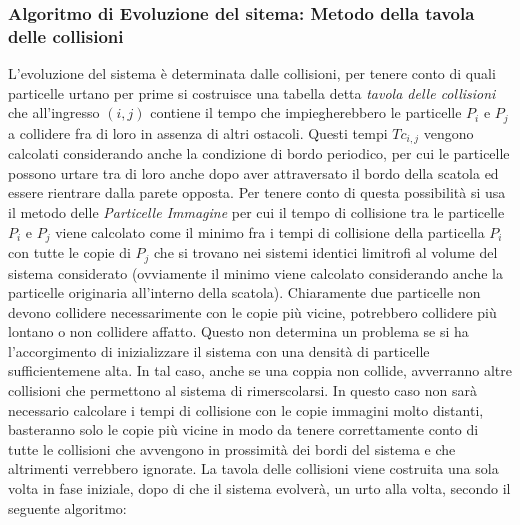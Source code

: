 \documentclass[11pt]{article}
\theoremstyle{plain}
\theoremstyle{remark}
\begin{document}
\subsubsection{Algoritmo di Evoluzione del sitema: Metodo della tavola delle collisioni}
L'evoluzione del sistema è determinata dalle collisioni, per tenere conto di quali particelle urtano per prime si costruisce una tabella detta \emph{tavola delle collisioni} che all'ingresso $(i,j)$ contiene il tempo che impiegherebbero le particelle $P_i$ e $P_j$ a collidere fra di loro in assenza di altri ostacoli.
Questi tempi $Tc_{i,j}$ vengono calcolati considerando anche la condizione di bordo periodico, per cui le particelle possono urtare tra di loro anche dopo aver attraversato il bordo della scatola ed essere rientrare dalla parete opposta.
\medskip\newline
Per tenere conto di questa possibilità si usa il metodo delle \emph{Particelle Immagine} per cui il tempo di collisione tra le particelle $P_i$ e $P_j$ viene calcolato come il minimo fra i tempi di collisione della particella $P_i$ con tutte le copie di $P_j$ che si trovano nei sistemi identici limitrofi al volume del sistema considerato (ovviamente il minimo viene calcolato considerando anche la particelle originaria all'interno della scatola).
\medskip\newline
Chiaramente due particelle non devono collidere necessarimente con le copie più vicine, potrebbero collidere più lontano o non collidere affatto. Questo non determina un problema se si ha l'accorgimento di inizializzare il sistema con una densità di particelle sufficientemene alta. In tal caso, anche se una coppia non collide, avverranno altre collisioni che permettono al sistema di rimerscolarsi. 
In questo caso non sarà necessario calcolare i tempi di collisione con le copie immagini molto distanti, basteranno solo le copie più vicine in modo da tenere correttamente conto di tutte le collisioni che avvengono in prossimità dei bordi del sistema e che altrimenti verrebbero ignorate.
\medskip\newline
La tavola delle collisioni viene costruita una sola volta in fase iniziale, dopo di che il sistema evolverà, un urto alla volta, secondo il seguente algoritmo:
\end{document}
